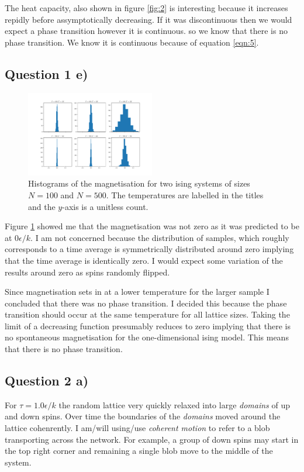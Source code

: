 \documentclass[a4paper, twocolumn]{article}
\begin{document}
The heat capacity, also shown %
in figure \ref{fig:2} is interesting because it increases %
repidly before assymptotically decreasing. If it was discontinuous %
then we would expect a phase transition however it is continuous. %
so we know that there is no phase transition. We know it is continuous %
because of equation \ref{eqn:5}. 


\subsection*{Question 1 e)}
\begin{figure}[h]
    \centering
    \includegraphics[width=0.5\textwidth]{pub/figures/magnetisation_ising_1d.pdf}
    \caption{Histograms of the magnetisation for two ising %
        systems of sizes \(N = 100\) and \(N = 500\). The %
        temperatures are labelled in the titles and the %
        \(y\)-axis is a unitless count.}
    \label{fig:3}
\end{figure}


Figure \ref{fig:3} showed me that the magnetisation was not zero %
as it was predicted to be at \(0 \epsilon / k\). I am not concerned %
because the distribution of samples, which roughly corresponds to %
a time average is symmetrically distributed around zero implying %
that the time average is identically zero. I would expect some %
variation of the results around zero as spins randomly flipped. %


Since magnetisation sets in at a lower temperature for the larger %
sample I concluded that there was no phase transition. I %
decided this because the phase transition should occur at the %
same temperature for all lattice sizes. Taking the limit of %
a decreasing function presumably reduces to zero implying that %
there is no spontaneous magnetisation for the one-dimensional %
ising model. This means that there is no phase transition. 


\subsection*{Question 2 a)}
For \(\tau = 1.0 \epsilon / k\) the random lattice very quickly %
relaxed into large \emph{domains} of up and down spins. Over time %
the boundaries of the \emph{domains} moved around the lattice %
cohenrently. I am/will using/use \emph{coherent motion} to refer %
to a blob transporting across the network. For example, a group %
of down spins may start in the top right corner and remaining %
a single blob move to the middle of the system. 
\end{document}
